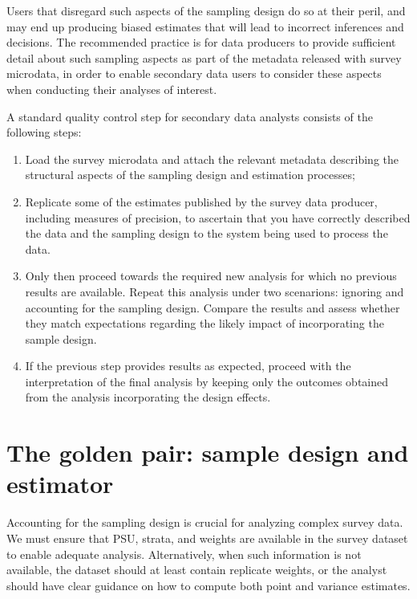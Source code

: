 \documentclass[
  12pt,
]{book}
\begin{document}
Users that disregard such aspects of the sampling design do so at their peril, and may end up producing biased estimates that will lead to incorrect inferences and decisions. The recommended practice is for data producers to provide sufficient detail about such sampling aspects as part of the metadata released with survey microdata, in order to enable secondary data users to consider these aspects when conducting their analyses of interest.

A standard quality control step for secondary data analysts consists of the following steps:

\begin{enumerate}
\def\labelenumi{\arabic{enumi}.}
\item
  Load the survey microdata and attach the relevant metadata describing the structural aspects of the sampling design and estimation processes;
\item
  Replicate some of the estimates published by the survey data producer, including measures of precision, to ascertain that you have correctly described the data and the sampling design to the system being used to process the data.
\item
  Only then proceed towards the required new analysis for which no previous results are available. Repeat this analysis under two scenarions: ignoring and accounting for the sampling design. Compare the results and assess whether they match expectations regarding the likely impact of incorporating the sample design.
\item
  If the previous step provides results as expected, proceed with the interpretation of the final analysis by keeping only the outcomes obtained from the analysis incorporating the design effects.
\end{enumerate}

\chapter{The golden pair: sample design and estimator}\label{the-golden-pair-sample-design-and-estimator}

Accounting for the sampling design is crucial for analyzing complex survey data. We must ensure that PSU, strata, and weights are available in the survey dataset to enable adequate analysis. Alternatively, when such information is not available, the dataset should at least contain replicate weights, or the analyst should have clear guidance on how to compute both point and variance estimates.
\end{document}
